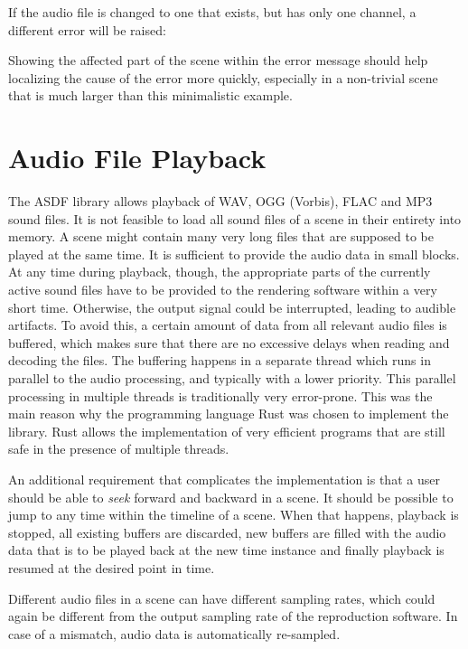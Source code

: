 

\noindent
If the audio file is changed to one that exists,
but has only one channel,
a different error will be raised:



\noindent
Showing the affected part of the scene within the error message
should help localizing the cause of the error more quickly,
especially in a non-trivial scene
that is much larger than this minimalistic example.


\section{Audio File Playback}
\label{sec:audio-file-playback}

The ASDF library allows playback of
WAV, OGG (Vorbis), FLAC and MP3 sound files.
It is not feasible to load all sound files of a scene
in their entirety into memory.
A scene might contain many very long files
that are supposed
to be played at the same time.
It is sufficient to provide the audio data in small blocks.
At any time during playback, though,
the appropriate parts of the currently active sound files
have to be provided to the rendering software
within a very short time.
Otherwise, the output signal could be interrupted,
leading to audible artifacts.
To avoid this,
a certain amount of data from all relevant audio files is buffered,
which makes sure that there are no excessive delays
when reading and decoding the files.
The buffering happens in a separate thread
which runs in parallel to the audio processing,
and typically with a lower priority.
This parallel processing in multiple threads
is traditionally very error-prone.
This was the
main reason why the programming language Rust was chosen
to implement the library.
Rust allows the implementation of very efficient programs
that are still safe in the presence of multiple threads.

An additional requirement that complicates the implementation
is that a user should be able to \emph{seek} forward and backward
in a scene.
It should be possible to jump to any time within the timeline of a scene.
When that happens,
playback is stopped, all existing buffers are discarded, new buffers are filled
with the audio data that is to be played back at the new time instance
and finally playback is resumed at the desired point in time.

Different audio files in a scene can have different sampling rates,
which could again be different from the output sampling rate of the reproduction
software.
In case of a mismatch, audio data is automatically re-sampled.


